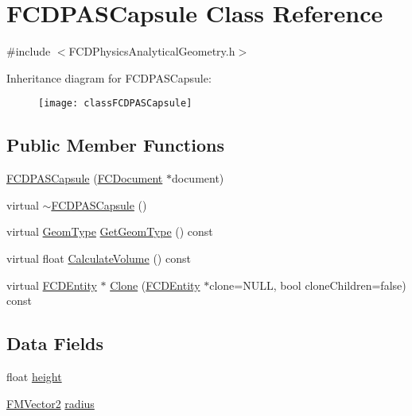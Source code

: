 \hypertarget{classFCDPASCapsule}{
\section{FCDPASCapsule Class Reference}
\label{classFCDPASCapsule}
}


{\ttfamily \#include $<$FCDPhysicsAnalyticalGeometry.h$>$}

Inheritance diagram for FCDPASCapsule:\begin{figure}[H]
\begin{center}
\leavevmode
\texttt{[image: classFCDPASCapsule]}
\end{center}
\end{figure}
\subsection*{Public Member Functions}
\begin{DoxyCompactItemize}
\item 
\hyperlink{classFCDPASCapsule_a02a0865e28bab31f5dce60e167895a1a}{FCDPASCapsule} (\hyperlink{classFCDocument}{FCDocument} $\ast$document)
\item 
virtual \hyperlink{classFCDPASCapsule_a872219e08c083b72f0f5e7d62c46cb7b}{$\sim$FCDPASCapsule} ()
\item 
virtual \hyperlink{classFCDPhysicsAnalyticalGeometry_a511583406e5c6a1bb5bd84c0453a452c}{GeomType} \hyperlink{classFCDPASCapsule_ad857a4a8159f4928d7260ed38fc46c22}{GetGeomType} () const 
\item 
virtual float \hyperlink{classFCDPASCapsule_a7aa385c582b13979465e5cb6e3b8665e}{CalculateVolume} () const 
\item 
virtual \hyperlink{classFCDEntity}{FCDEntity} $\ast$ \hyperlink{classFCDPASCapsule_a62a029b060c2bcf64cac963bf9896a92}{Clone} (\hyperlink{classFCDEntity}{FCDEntity} $\ast$clone=NULL, bool cloneChildren=false) const 
\end{DoxyCompactItemize}
\subsection*{Data Fields}
\begin{DoxyCompactItemize}
\item 
float \hyperlink{classFCDPASCapsule_a55d417e585c9eee8ec7c5a66702424d8}{height}
\item 
\hyperlink{classFMVector2}{FMVector2} \hyperlink{classFCDPASCapsule_a3f5d8e952d457e80e0c1c6abd092d96e}{radius}
\end{DoxyCompactItemize}


